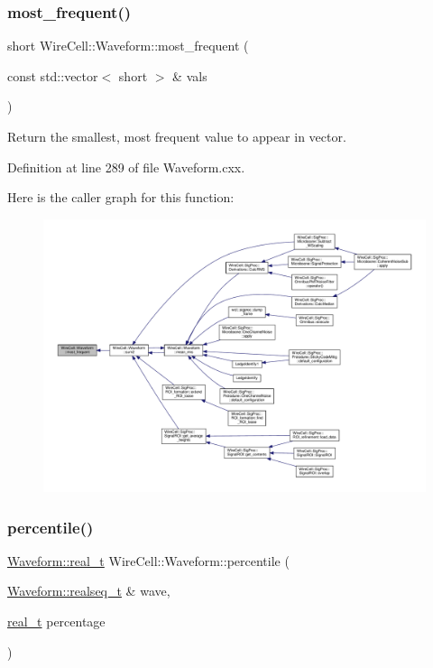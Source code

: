 \subsubsection{\texorpdfstring{most\+\_\+frequent()}{most\_frequent()}}
{\footnotesize\ttfamily short Wire\+Cell\+::\+Waveform\+::most\+\_\+frequent (\begin{DoxyParamCaption}\item[{const std\+::vector$<$ short $>$ \&}]{vals }\end{DoxyParamCaption})}



Return the smallest, most frequent value to appear in vector. 



Definition at line 289 of file Waveform.\+cxx.

Here is the caller graph for this function\+:
\nopagebreak
\begin{figure}[H]
\begin{center}
\leavevmode
\includegraphics[width=350pt]{namespace_wire_cell_1_1_waveform_a86192f53532ba1e28516c2f8f3a9fa44_icgraph}
\end{center}
\end{figure}
\mbox{\label{namespace_wire_cell_1_1_waveform_a9116b8ebe848721a04d5100fa672b0aa}} 
\subsubsection{\texorpdfstring{percentile()}{percentile()}}
{\footnotesize\ttfamily \hyperlink{namespace_wire_cell_1_1_waveform_a47570354e4599d8387803188186aba1f}{Waveform\+::real\+\_\+t} Wire\+Cell\+::\+Waveform\+::percentile (\begin{DoxyParamCaption}\item[{\hyperlink{namespace_wire_cell_1_1_waveform_a479175e541c8545e87cd8063b74b6956}{Waveform\+::realseq\+\_\+t} \&}]{wave,  }\item[{\hyperlink{namespace_wire_cell_1_1_waveform_a47570354e4599d8387803188186aba1f}{real\+\_\+t}}]{percentage }\end{DoxyParamCaption})}



